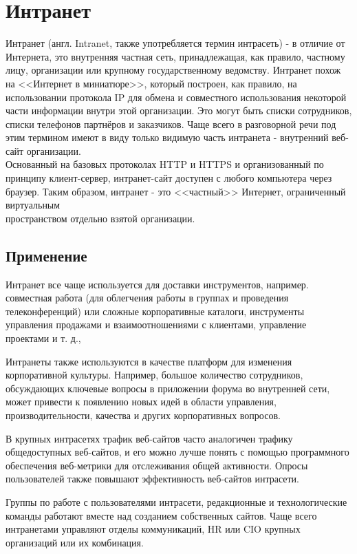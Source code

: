 \documentclass[a4page]{article}
\begin{document}
\section{Интранет}
Интранет (англ. Intranet, также употребляется термин интрасеть) - в отличие от Интернета, это внутренняя частная сеть, принадлежащая, как правило, частному лицу, организации или крупному государственному ведомству.\cite{enwiki:intranet} Интранет похож на <<Интернет в миниатюре>>, который построен, как правило, на использовании протокола IP для обмена и совместного использования некоторой части информации внутри этой организации. Это могут быть списки сотрудников, списки телефонов партнёров и заказчиков. Чаще всего в разговорной речи под этим термином имеют в виду только видимую часть интранета - внутренний веб-сайт организации.\\ Основанный на базовых протоколах HTTP и HTTPS и организованный по принципу клиент-сервер, интранет-сайт доступен с любого компьютера через браузер. Таким образом, интранет - это <<частный>> Интернет, ограниченный виртуальным\\ пространством отдельно взятой организации. 

\subsection{Применение}
Интранет все чаще используется для доставки инструментов, например. совместная работа (для облегчения работы в группах и проведения телеконференций) или сложные корпоративные каталоги, инструменты управления продажами и взаимо\-отношениями с клиентами, управление проектами и т. д.,

Интранеты также используются в качестве платформ для изменения корпоративной культуры. Например, большое количество сотрудников, обсуждающих ключевые вопросы в приложении форума во внутренней сети, может привести к появлению новых идей в области управления, производительности, качества и других корпо\-ративных вопросов.

В крупных интрасетях трафик веб-сайтов часто аналогичен трафику общедоступных веб-сайтов, и его можно лучше понять с помощью программного обеспечения веб-метрики для отслеживания общей активности. Опросы пользователей также повышают эффективность веб-сайтов интрасети.

Группы по работе с пользователями интрасети, редакционные и технологические команды работают вместе над созданием собственных сайтов. Чаще всего интранетами управляют отделы коммуникаций, HR или CIO крупных организаций или их комбинация.
\end{document}
